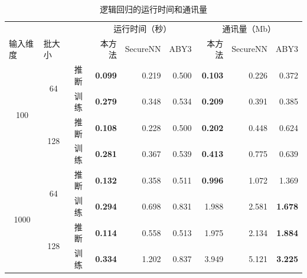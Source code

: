 \begin{table}[h!]
\caption{逻辑回归的运行时间和通讯量}
\label{tab:ss-perm:logistic}
\renewcommand{\arraystretch}{0.8}
\begin{tabular}{@{}cccrrrrrr@{}}
    \toprule
    \multicolumn{1}{l}{}     & \multicolumn{1}{l}{}    &    & \multicolumn{3}{c}{运行时间（秒）}       & \multicolumn{3}{c}{通讯量（Mb）}       \\ 
    \cmidrule(lr){4-6}\cmidrule(lr){7-9}
    \multicolumn{1}{l}{输入维度} & \multicolumn{1}{l}{批大小} &    & 本方法            & SecureNN & ABY3  & 本方法            & SecureNN & ABY3  \\ 
    \cmidrule(lr){1-3}\cmidrule(lr){4-6}\cmidrule(lr){7-9}
    \multirow{4}{*}{100}     & \multirow{2}{*}{64}     & 推断 & \textbf{0.099} & 0.219    & 0.500 & \textbf{0.103} & 0.226    & 0.372 \\ \cmidrule(l){3-3}\cmidrule(lr){4-6}\cmidrule(lr){7-9}
        &                      & 训练 & \textbf{0.279} & 0.348 & 0.534 & \textbf{0.209} & 0.391 & 0.385          \\ \cmidrule(l){2-3}\cmidrule(lr){4-6}\cmidrule(lr){7-9}
        & \multirow{2}{*}{128} & 推断 & \textbf{0.108} & 0.228 & 0.500 & \textbf{0.202} & 0.448 & 0.624          \\ \cmidrule(l){3-3}\cmidrule(lr){4-6}\cmidrule(lr){7-9}
        &                      & 训练 & \textbf{0.281} & 0.367 & 0.539 & \textbf{0.413} & 0.775 & 0.639          \\ \midrule
    \multirow{4}{*}{1000}    & \multirow{2}{*}{64}     & 推断 & \textbf{0.132} & 0.358    & 0.511 & \textbf{0.996} & 1.072    & 1.369 \\ \cmidrule(l){3-3}\cmidrule(lr){4-6}\cmidrule(lr){7-9}
        &                      & 训练 & \textbf{0.294} & 0.698 & 0.831 & 1.988          & 2.581 & \textbf{1.678} \\ \cmidrule(l){2-3}\cmidrule(lr){4-6}\cmidrule(lr){7-9}
        & \multirow{2}{*}{128} & 推断 & \textbf{0.114} & 0.558 & 0.513 & 1.975          & 2.134 & \textbf{1.884} \\ \cmidrule(l){3-3}\cmidrule(lr){4-6}\cmidrule(lr){7-9}
        &                      & 训练 & \textbf{0.334} & 1.202 & 0.837 & 3.949          & 5.121 & \textbf{3.225} \\ \bottomrule
\end{tabular}
\end{table}

